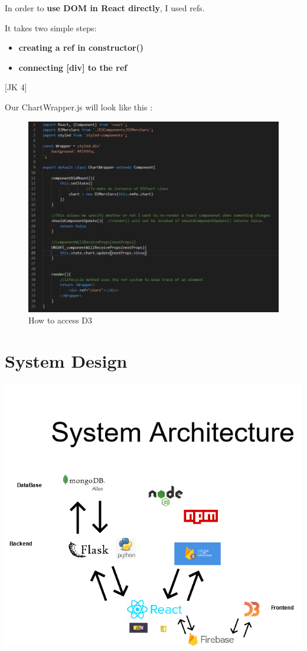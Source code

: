 In order to \textbf{use DOM in React directly}, I used refs.

It takes two simple steps:

\begin{itemize}

\item \textbf{creating a ref in constructor()}
\item \textbf{connecting [div] to the ref}

\end{itemize} [JK 4]

Our ChartWrapper.js will look like this :


\begin{figure}[ht]
    \centering
    \includegraphics[scale=0.7]{img/D3Ref.PNG}
    \caption{How to access D3}
    \label{fig:my_label4}
\end{figure}

\chapter{System Design}
\begin{center}
      \includegraphics[scale=0.5]{img/basic architecture.png}
\end{center}

